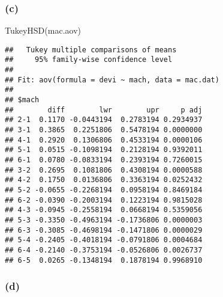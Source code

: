 \documentclass[
]{article}
\newenvironment{Shaded}{\begin{snugshade}}{\end{snugshade}}
\newcommand{\FunctionTok}[1]{\textcolor[rgb]{0.00,0.00,0.00}{#1}}
\newcommand{\NormalTok}[1]{#1}
\begin{document}
\hypertarget{c}{%
\subsubsection{(c)}\label{c}}

\begin{Shaded}
\begin{Highlighting}[]
\FunctionTok{TukeyHSD}\NormalTok{(mac.aov)}
\end{Highlighting}
\end{Shaded}

\begin{verbatim}
##   Tukey multiple comparisons of means
##     95% family-wise confidence level
## 
## Fit: aov(formula = devi ~ mach, data = mac.dat)
## 
## $mach
##        diff        lwr        upr     p adj
## 2-1  0.1170 -0.0443194  0.2783194 0.2934937
## 3-1  0.3865  0.2251806  0.5478194 0.0000000
## 4-1  0.2920  0.1306806  0.4533194 0.0000106
## 5-1  0.0515 -0.1098194  0.2128194 0.9392011
## 6-1  0.0780 -0.0833194  0.2393194 0.7260015
## 3-2  0.2695  0.1081806  0.4308194 0.0000588
## 4-2  0.1750  0.0136806  0.3363194 0.0252432
## 5-2 -0.0655 -0.2268194  0.0958194 0.8469184
## 6-2 -0.0390 -0.2003194  0.1223194 0.9815028
## 4-3 -0.0945 -0.2558194  0.0668194 0.5359056
## 5-3 -0.3350 -0.4963194 -0.1736806 0.0000003
## 6-3 -0.3085 -0.4698194 -0.1471806 0.0000029
## 5-4 -0.2405 -0.4018194 -0.0791806 0.0004684
## 6-4 -0.2140 -0.3753194 -0.0526806 0.0026737
## 6-5  0.0265 -0.1348194  0.1878194 0.9968910
\end{verbatim}

\hypertarget{d}{%
\subsubsection{(d)}\label{d}}
\end{document}
